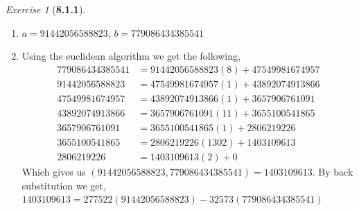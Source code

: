 \documentclass[12pt]{amsart}
\makeatletter
\theoremstyle{remark}
\newtheorem*{exercise}{Exercise}%
\renewenvironment{proof}[1][\proofname]{\par\doublespacing
  \pushQED{\qed}%
  \normalfont \topsep6\p@\@plus6\p@\relax
  \list{}{%
    \settowidth{\leftmargin}{\itshape\proofname:\hskip\labelsep}%
    \setlength{\labelwidth}{0pt}%
    \setlength{\itemindent}{-\leftmargin}%
  }%
  \item[\hskip\labelsep\itshape#1\@addpunct{:}]\ignorespaces
}{%
  \popQED\endlist\@endpefalse
  \singlespacing
}
\theoremstyle{mycomment}
\makeatother
\begin{document}
\begin{exercise}[\textbf{8.1.1}]
\begin{enumerate}
    \item[e.] $a = 91442056588823$, $b = 779086434385541$
    \begin{proof} Using the euclidean algorithm we get the following, 
      \begin{align*}
        779086434385541 &= 91442056588823(8) + 47549981674957\\
        91442056588823 &= 47549981674957(1) + 43892074913866\\
        47549981674957 &= 43892074913866(1) + 3657906761091\\
        43892074913866 &= 3657906761091(11) + 3655100541865\\
        3657906761091 &=  3655100541865(1) + 2806219226\\
        3655100541865 &= 2806219226(1302) + 1403109613\\
        2806219226 &= 1403109613(2) + 0
      \end{align*}
      Which gives us $(91442056588823,779086434385541) = 1403109613$. By back substitution we get, $1403109613 = 277522(91442056588823) - 32573(779086434385541)$
    \end{proof}

  \end{enumerate}
\end{exercise}
\vspace{.5in}
\end{document}
